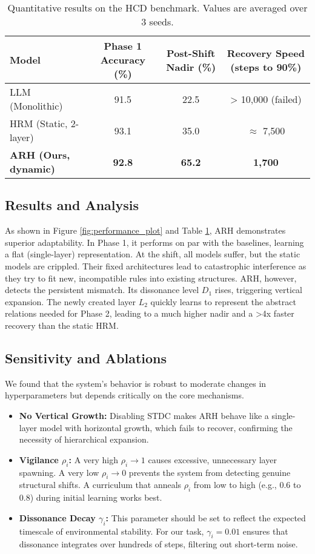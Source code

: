 \documentclass{article}
\begin{document}
\begin{table}[h!]
\centering
\caption{Quantitative results on the HCD benchmark. Values are averaged over 3 seeds.}
\label{tab:results_hcd}
\begin{tabular}{@{}lccc@{}}
\toprule
Model & Phase 1 Accuracy (\%) & Post-Shift Nadir (\%) & Recovery Speed (steps to 90\%) \\
\midrule
LLM (Monolithic) & 91.5 & 22.5 & > 10,000 (failed) \\
HRM (Static, 2-layer) & 93.1 & 35.0 & $\approx$ 7,500 \\
\textbf{ARH (Ours, dynamic)} & \textbf{92.8} & \textbf{65.2} & \textbf{1,700} \\
\bottomrule
\end{tabular}
\end{table}

\subsection{Results and Analysis}
As shown in Figure \ref{fig:performance_plot} and Table \ref{tab:results_hcd}, ARH demonstrates superior adaptability. In Phase 1, it performs on par with the baselines, learning a flat (single-layer) representation. At the shift, all models suffer, but the static models are crippled. Their fixed architectures lead to catastrophic interference as they try to fit new, incompatible rules into existing structures. ARH, however, detects the persistent mismatch. Its dissonance level $D_1$ rises, triggering vertical expansion. The newly created layer $L_2$ quickly learns to represent the abstract relations needed for Phase 2, leading to a much higher nadir and a >4x faster recovery than the static HRM.

\subsection{Sensitivity and Ablations}
We found that the system's behavior is robust to moderate changes in hyperparameters but depends critically on the core mechanisms.
\begin{itemize}
    \item \textbf{No Vertical Growth:} Disabling STDC makes ARH behave like a single-layer model with horizontal growth, which fails to recover, confirming the necessity of hierarchical expansion.
    \item \textbf{Vigilance $\rho_i$:} A very high $\rho_i \to 1$ causes excessive, unnecessary layer spawning. A very low $\rho_i \to 0$ prevents the system from detecting genuine structural shifts. A curriculum that anneals $\rho_i$ from low to high (e.g., 0.6 to 0.8) during initial learning works best.
    \item \textbf{Dissonance Decay $\gamma_i$:} This parameter should be set to reflect the expected timescale of environmental stability. For our task, $\gamma_i=0.01$ ensures that dissonance integrates over hundreds of steps, filtering out short-term noise.
\end{itemize}
\end{document}
